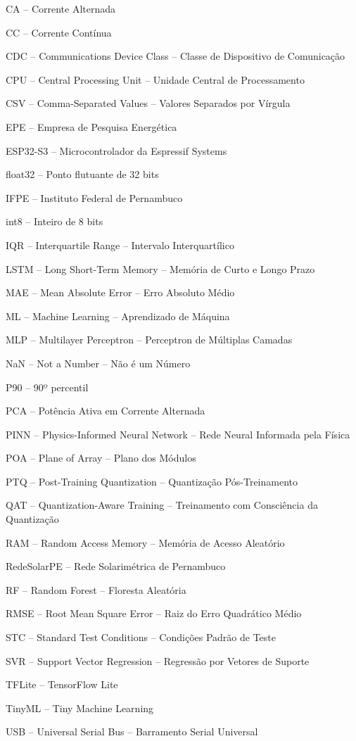 
\begingroup
\SingleSpacing
\begin{flushleft}
CA -- Corrente Alternada\par
CC -- Corrente Contínua\par
CDC -- Communications Device Class -- Classe de Dispositivo de Comunicação\par
CPU -- Central Processing Unit -- Unidade Central de Processamento\par
CSV -- Comma-Separated Values -- Valores Separados por Vírgula\par
EPE -- Empresa de Pesquisa Energética\par
ESP32-S3 -- Microcontrolador da Espressif Systems\par
float32 -- Ponto flutuante de 32 bits\par
IFPE -- Instituto Federal de Pernambuco\par
int8 -- Inteiro de 8 bits\par
IQR -- Interquartile Range -- Intervalo Interquartílico\par
LSTM -- Long Short-Term Memory -- Memória de Curto e Longo Prazo\par
MAE -- Mean Absolute Error -- Erro Absoluto Médio\par
ML -- Machine Learning -- Aprendizado de Máquina\par
MLP -- Multilayer Perceptron -- Perceptron de Múltiplas Camadas\par
NaN -- Not a Number -- Não é um Número\par
P90 -- 90º percentil\par
PCA -- Potência Ativa em Corrente Alternada\par
PINN -- Physics-Informed Neural Network -- Rede Neural Informada pela Física\par
POA -- Plane of Array -- Plano dos Módulos\par
PTQ -- Post-Training Quantization -- Quantização Pós-Treinamento\par
QAT -- Quantization-Aware Training -- Treinamento com Consciência da Quantização\par
RAM -- Random Access Memory -- Memória de Acesso Aleatório\par
RedeSolarPE -- Rede Solarimétrica de Pernambuco\par
RF -- Random Forest -- Floresta Aleatória\par
RMSE -- Root Mean Square Error -- Raiz do Erro Quadrático Médio\par
STC -- Standard Test Conditions -- Condições Padrão de Teste\par
SVR -- Support Vector Regression -- Regressão por Vetores de Suporte\par
TFLite -- TensorFlow Lite\par
TinyML -- Tiny Machine Learning\par
USB -- Universal Serial Bus -- Barramento Serial Universal\par
\end{flushleft}
\endgroup
